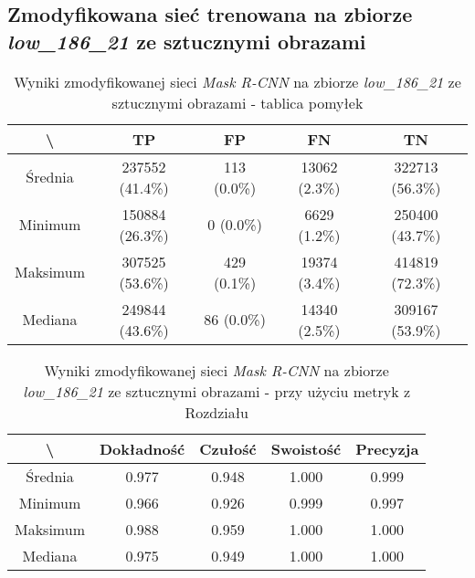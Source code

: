 \subsection{Zmodyfikowana sieć trenowana na zbiorze \textit{low\_186\_21} ze sztucznymi obrazami}

\begin{table}[H]
	\centering
	\caption{Wyniki zmodyfikowanej sieci \textit{Mask R-CNN} na zbiorze \textit{low\_186\_21} ze sztucznymi obrazami - tablica pomyłek}
	\vspace{6pt}
	{\footnotesize
		\begin{tabular}{|c|c|c|c|c|}
      \hline \textbackslash & TP & FP & FN & TN \\
      \hline Średnia & 237552 (41.4\%) & 113 (0.0\%) & 13062 (2.3\%) & 322713 (56.3\%) \\
      \hline Minimum & 150884 (26.3\%) & 0 (0.0\%) & 6629 (1.2\%) & 250400 (43.7\%) \\
      \hline Maksimum & 307525 (53.6\%) & 429 (0.1\%) & 19374 (3.4\%) & 414819 (72.3\%) \\
      \hline Mediana & 249844 (43.6\%) & 86 (0.0\%) & 14340 (2.5\%) & 309167 (53.9\%) \\
      \hline
		\end{tabular}
	}
  \vspace{0pt}
  \label{Tab:low_modified_generated}
\end{table}


\begin{table}[H]
	\centering
	\caption{Wyniki zmodyfikowanej sieci \textit{Mask R-CNN} na zbiorze \textit{low\_186\_21} ze sztucznymi obrazami - przy użyciu metryk z Rozdziału }
	\vspace{6pt}
	{\footnotesize
		\begin{tabular}{|c|c|c|c|c|}
      \hline \textbackslash & Dokładność & Czułość & Swoistość & Precyzja \\
      \hline Średnia & 0.977 & 0.948 & 1.000 & 0.999 \\
      \hline Minimum & 0.966 & 0.926 & 0.999 & 0.997 \\
      \hline Maksimum & 0.988 & 0.959 & 1.000 & 1.000 \\
      \hline Mediana & 0.975 & 0.949 & 1.000 & 1.000 \\
      \hline
		\end{tabular}
	}
  \vspace{0pt}
  \label{Tab:low_modified_generated_calculated}
\end{table}

